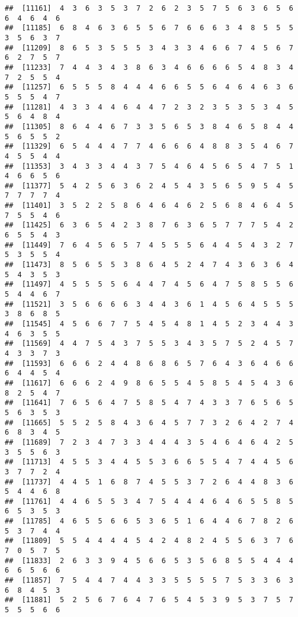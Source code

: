 \documentclass[
]{book}
\begin{document}
\begin{verbatim}
##  [11161]  4  3  6  3  5  3  7  2  6  2  3  5  7  5  6  3  6  5  6  6  4  6  4  6
##  [11185]  6  8  4  6  3  6  5  5  6  7  6  6  6  3  4  8  5  5  5  3  5  6  3  7
##  [11209]  8  6  5  3  5  5  5  3  4  3  3  4  6  6  7  4  5  6  7  6  2  7  5  7
##  [11233]  7  4  4  3  4  3  8  6  3  4  6  6  6  6  5  4  8  3  4  7  2  5  5  4
##  [11257]  6  5  5  5  8  4  4  4  6  6  5  5  6  4  6  4  6  3  6  5  5  5  4  7
##  [11281]  4  3  3  4  4  6  4  4  7  2  3  2  3  5  3  5  3  4  5  5  6  4  8  4
##  [11305]  8  6  4  4  6  7  3  3  5  6  5  3  8  4  6  5  8  4  4  5  6  5  5  2
##  [11329]  6  5  4  4  4  7  7  4  6  6  6  4  8  8  3  5  4  6  7  4  5  5  4  4
##  [11353]  3  4  3  3  4  4  3  7  5  4  6  4  5  6  5  4  7  5  1  4  6  6  5  6
##  [11377]  5  4  2  5  6  3  6  2  4  5  4  3  5  6  5  9  5  4  5  7  7  7  7  4
##  [11401]  3  5  2  2  5  8  6  4  6  4  6  2  5  6  8  4  6  4  5  7  5  5  4  6
##  [11425]  6  3  6  5  4  2  3  8  7  6  3  6  5  7  7  7  5  4  2  6  5  5  4  3
##  [11449]  7  6  4  5  6  5  7  4  5  5  5  6  4  4  5  4  3  2  7  5  3  5  5  4
##  [11473]  8  5  6  5  5  3  8  6  4  5  2  4  7  4  3  6  3  6  4  5  4  3  5  3
##  [11497]  4  5  5  5  5  6  4  4  7  4  5  6  4  7  5  8  5  5  6  5  4  4  6  7
##  [11521]  3  5  6  6  6  6  3  4  4  3  6  1  4  5  6  4  5  5  5  3  8  6  8  5
##  [11545]  4  5  6  6  7  7  5  4  5  4  8  1  4  5  2  3  4  4  3  4  6  3  5  5
##  [11569]  4  4  7  5  4  3  7  5  5  3  4  3  5  7  5  2  4  5  7  4  3  3  7  3
##  [11593]  6  6  6  2  4  4  8  6  8  6  5  7  6  4  3  6  4  6  6  6  4  4  5  4
##  [11617]  6  6  6  2  4  9  8  6  5  5  4  5  8  5  4  5  4  3  6  8  2  5  4  7
##  [11641]  7  6  5  6  4  7  5  8  5  4  7  4  3  3  7  6  5  6  5  5  6  3  5  3
##  [11665]  5  5  2  5  8  4  3  6  4  5  7  7  3  2  6  4  2  7  4  6  8  3  4  5
##  [11689]  7  2  3  4  7  3  3  4  4  4  3  5  4  6  4  6  4  2  5  3  5  5  6  3
##  [11713]  4  5  5  3  4  4  5  5  3  6  6  5  5  4  7  4  4  5  6  3  7  7  2  4
##  [11737]  4  4  5  1  6  8  7  4  5  5  3  7  2  6  4  4  8  3  6  5  4  4  6  8
##  [11761]  4  4  6  5  5  3  4  7  5  4  4  4  6  4  6  5  5  8  5  6  5  3  5  3
##  [11785]  4  6  5  5  6  6  5  3  6  5  1  6  4  4  6  7  8  2  6  5  3  7  4  4
##  [11809]  5  5  4  4  4  4  5  4  2  4  8  2  4  5  5  6  3  7  6  7  0  5  7  5
##  [11833]  2  6  3  3  9  4  5  6  6  5  3  5  6  8  5  5  4  4  4  6  6  5  6  6
##  [11857]  7  5  4  4  7  4  4  3  3  5  5  5  5  7  5  3  3  6  3  6  8  4  5  3
##  [11881]  5  2  5  6  7  6  4  7  6  5  4  5  3  9  5  3  7  5  7  5  5  5  6  6

\end{verbatim}
\end{document}
